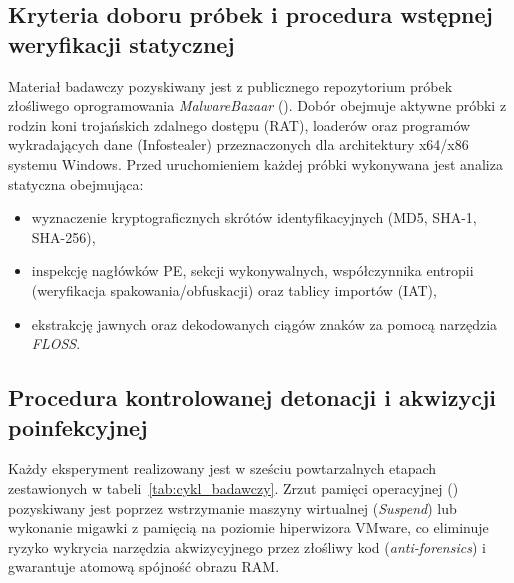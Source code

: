 \subsection{Kryteria doboru próbek i procedura wstępnej weryfikacji statycznej}\label{subsec:dobor_probek}

Materiał badawczy pozyskiwany jest z publicznego repozytorium próbek złośliwego oprogramowania \textit{MalwareBazaar} (). Dobór obejmuje aktywne próbki z rodzin koni trojańskich zdalnego dostępu (RAT), loaderów oraz programów wykradających dane (Infostealer) przeznaczonych dla architektury x64/x86 systemu Windows. Przed uruchomieniem każdej próbki wykonywana jest analiza statyczna obejmująca:
\begin{itemize}
    \item wyznaczenie kryptograficznych skrótów identyfikacyjnych (MD5, SHA-1, SHA-256),
    \item inspekcję nagłówków PE, sekcji wykonywalnych, współczynnika entropii (weryfikacja spakowania/obfuskacji) oraz tablicy importów (IAT),
    \item ekstrakcję jawnych oraz dekodowanych ciągów znaków za pomocą narzędzia \textit{FLOSS}.
\end{itemize}

\subsection{Procedura kontrolowanej detonacji i akwizycji poinfekcyjnej}\label{subsec:procedura_detonacji}

Każdy eksperyment realizowany jest w sześciu powtarzalnych etapach zestawionych w tabeli~\ref{tab:cykl_badawczy}. Zrzut pamięci operacyjnej () pozyskiwany jest poprzez wstrzymanie maszyny wirtualnej (\textit{Suspend}) lub wykonanie migawki z pamięcią na poziomie hiperwizora VMware, co eliminuje ryzyko wykrycia narzędzia akwizycyjnego przez złośliwy kod (\textit{anti-forensics}) i gwarantuje atomową spójność obrazu RAM.

